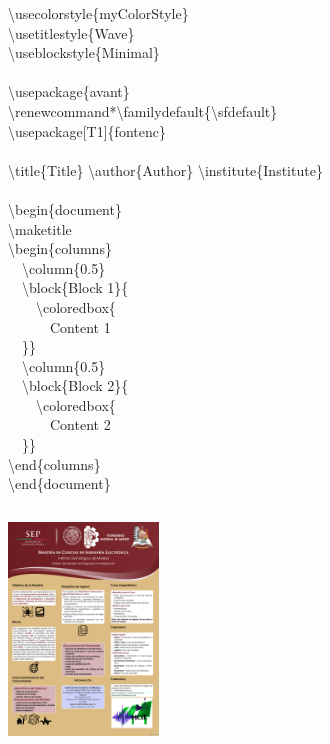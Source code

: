 \documentclass[9pt]{beamer}
\newcommand{\bs}{\textbackslash}   %
\begin{document}
\begin{frame}
\begin{columns}[t]
    \begin{minipage}[t]{0.5\textwidth}
      \bs usecolorstyle\{myColorStyle\}\\
      \bs usetitlestyle\{Wave\}\\
      \bs useblockstyle\{Minimal\}\\
      \\
      \bs usepackage\{avant\}\\
      \bs renewcommand*\bs familydefault\{\bs sfdefault\}\\
      \bs usepackage[T1]\{fontenc\}\\
      \\
      \bs title\{Title\}%
      \bs author\{Author\}%
      \bs institute\{Institute\}\\ 
      \\
      \bs begin\{document\}\\
      \bs maketitle\\
      \bs begin\{columns\}\\
      \mbox{~~}\bs column\{0.5\}\\
      \mbox{~~}\bs block\{Block 1\}\{\\
      \mbox{~~~~}\bs coloredbox\{\\
      \mbox{~~~~~~}Content 1\\
      \mbox{~~}\}\}\\
      \mbox{~~}\bs column\{0.5\}\\
      \mbox{~~}\bs block\{Block 2\}\{\\
      \mbox{~~~~}\bs coloredbox\{\\
      \mbox{~~~~~~}Content 2\\
      \mbox{~~}\}\}\\
      \bs end\{columns\}\\
      \bs end\{document\}
    \end{minipage}
  \end{columns}

  \vspace{-4cm}\hspace{7cm}\includegraphics[width=4cm]{mytheme.pdf}

  ~\\~\\~\\~\\~\\
\end{frame}
\end{document}

